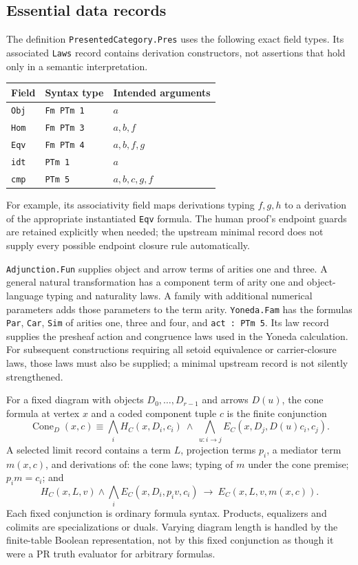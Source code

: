 \subsection{Essential data records}
The definition \texttt{PresentedCategory.Pres} uses the following exact
field types. Its associated \texttt{Laws} record contains derivation
constructors, not assertions that hold only in a semantic interpretation.
\begin{center}
\begin{tabular}{lll}
\toprule
Field & Syntax type & Intended arguments\\
\midrule
\texttt{Obj} & \texttt{Fm PTm 1} & $a$\\
\texttt{Hom} & \texttt{Fm PTm 3} & $a,b,f$\\
\texttt{Eqv} & \texttt{Fm PTm 4} & $a,b,f,g$\\
\texttt{idt} & \texttt{PTm 1} & $a$\\
\texttt{cmp} & \texttt{PTm 5} & $a,b,c,g,f$\\
\bottomrule
\end{tabular}
\end{center}
For example, its associativity field maps derivations typing $f,g,h$
to a derivation of the appropriate instantiated \texttt{Eqv} formula.
The human proof's endpoint guards are retained explicitly when needed;
the upstream minimal record does not supply every possible endpoint
closure rule automatically.

\texttt{Adjunction.Fun} supplies object and arrow terms of arities one
and three. A general natural transformation has a component term of
arity one and object-language typing and naturality laws. A family with
additional numerical parameters adds those parameters to the term arity.
\texttt{Yoneda.Fam} has the formulas \texttt{Par}, \texttt{Car},
\texttt{Sim} of arities one, three and four, and \texttt{act : PTm 5}.
Its law record supplies the presheaf action and congruence laws used in
the Yoneda calculation. For subsequent constructions requiring all
setoid equivalence or carrier-closure laws, those laws must also be
supplied; a minimal upstream record is not silently strengthened.

For a fixed diagram with objects $D_0,\ldots,D_{r-1}$ and arrows $D(u)$,
the cone formula at vertex $x$ and a coded component tuple $c$ is the
finite conjunction
\[
 \operatorname{Cone}_D(x,c)\equiv
 \bigwedge_i H_C(x,D_i,c_i)\ \wedge\
 \bigwedge_{u:i\to j}E_C(x,D_j,D(u)c_i,c_j).
\]
A selected limit record contains a term $L$, projection terms $p_i$,
a mediator term $m(x,c)$, and derivations of: the cone laws; typing of
$m$ under the cone premise; $p_i m=c_i$; and
\[
 H_C(x,L,v)\wedge\bigwedge_i E_C(x,D_i,p_i v,c_i)
           \ \longrightarrow\ E_C(x,L,v,m(x,c)).
\]
Each fixed conjunction is ordinary formula syntax. Products, equalizers
and colimits are specializations or duals. Varying diagram length is
handled by the finite-table Boolean representation, not by this fixed
conjunction as though it were a PR truth evaluator for arbitrary formulas.

